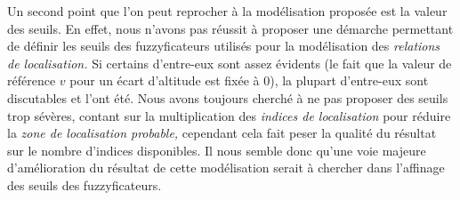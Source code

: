 Un second point que l'on peut reprocher à la modélisation proposée est
la valeur des seuils. En effet, nous n'avons pas réussit à proposer
une démarche permettant de définir les seuils des fuzzyficateurs
utilisés pour la modélisation des \emph{relations de localisation.} Si
certains d'entre-eux sont assez évidents (\eg le fait que la valeur de
référence \(v\) pour un écart d'altitude est fixée à 0), la plupart
d'entre-eux sont discutables et l'ont été. Nous avons toujours cherché
à ne pas proposer des seuils trop sévères, contant sur la
multiplication des \emph{indices de localisation} pour réduire la
\emph{zone de localisation probable,} cependant cela fait peser la
qualité du résultat sur le nombre d'indices disponibles. Il nous
semble donc qu'une voie majeure d’amélioration du résultat de cette
modélisation serait à chercher dans l'affinage des seuils des
fuzzyficateurs.

